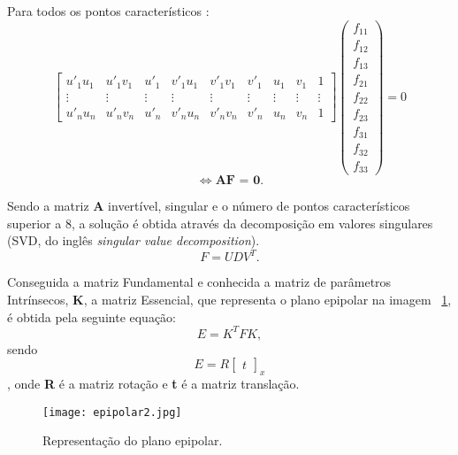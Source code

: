 Para todos os pontos característicos : \[  \left[ \begin{array}{ccccccccc }
u'_{1}u_{1} & u'_{1}v_{1} & u'_{1} & v'_{1}u_{1} & v'_{1}v_{1} & v'_{1} & u_{1} & v_{1} & 1 \\ 
\vdots  & \vdots  & \vdots  & \vdots  & \vdots  & \vdots  & \vdots  & \vdots  & \vdots \\ 
u'_nu_n & u'_nv_n & u'_n & v'_nu_n & v'_nv_n & v'_n & u_n & v_n & 1
\end{array}\right] \left( \begin{array}{ccccccccc}
f_{11}\\
f_{12}\\
f_{13}\\
f_{21}\\
f_{22}\\
f_{23}\\
f_{31}\\
f_{32}\\
f_{33}
\end{array} \right) = 0 \]  \begin{equation}\label{equ:af=0}
\Leftrightarrow \textbf{AF = 0}. 
\end{equation}

Sendo a matriz \textbf{A} invertível, singular  e o número de pontos característicos superior a 8, a solução é obtida através da decomposição em valores singulares (SVD, do inglês \textit{singular value decomposition}).  \[ F = U D V^{T}.\]


Conseguida a matriz Fundamental e conhecida a matriz de parâmetros Intrínsecos, \textbf{K}, a matriz Essencial, que representa o plano epipolar na imagem ~\ref{fig:esseciallinemat}, é obtida pela seguinte equação:
\[ E = {K}^{T} F K, \]  sendo \[ E = R \left[\begin{array}{c}
t
\end{array}\right]_{x} \], onde \textbf{R} é a matriz rotação e \textbf{t} é a matriz translação.

\begin{figure}[h!] %
	\begin{center}
		\leavevmode		
		\texttt{[image: epipolar2.jpg]}
		\caption{Representação do plano epipolar.\cite{Fraundorfer2012}}
		\label{fig:esseciallinemat}
	\end{center}
\end{figure}

